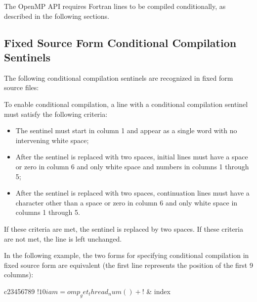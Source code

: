 \begin{fortranspecific}
The OpenMP API requires Fortran lines to be compiled conditionally, as described in
the following sections.




\subsection{Fixed Source Form Conditional Compilation Sentinels}
\label{subsec:Fixed Source Form Conditional Compilation Sentinels}

The following conditional compilation sentinels are recognized in fixed form source
files:


To enable conditional compilation, a line with a conditional compilation sentinel must
satisfy the following criteria:

\begin{itemize}
\item The sentinel must start in column 1 and appear as a single word with no 
      intervening white space;

\item After the sentinel is replaced with two spaces, initial lines must have a 
      space or zero in column 6 and only white space and numbers in columns 1 
      through 5;

\item After the sentinel is replaced with two spaces, continuation lines must have 
      a character other than a space or zero in column 6 and only white space in 
      columns 1 through 5.
\end{itemize}

If these criteria are met, the sentinel is replaced by two spaces. If these criteria 
are not met, the line is left unchanged.

\begin{note}
In the following example, the two forms for specifying conditional compilation
in fixed source form are equivalent (the first line represents the position of 
the first 9 columns):

\begin{ompfPragma}
c23456789
!$ 10 iam = omp_get_thread_num() +
!$   &          index


\end{ompfPragma}
\end{note}
\end{fortranspecific}
